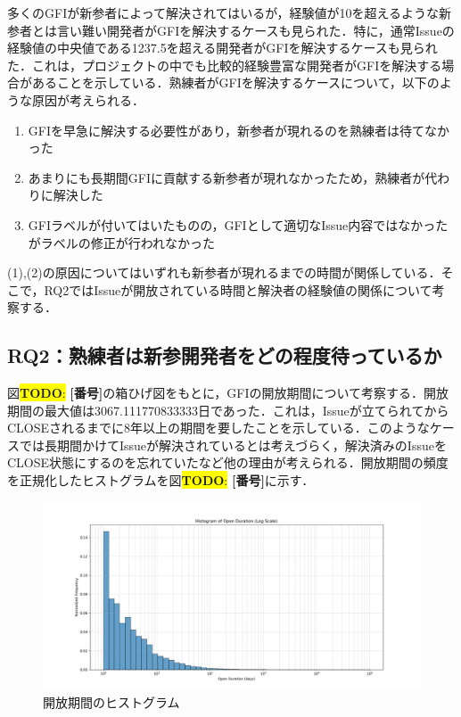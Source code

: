 \documentclass[11pt]{jreport}
\newcommand{\todo}[1]{\colorbox{yellow}{{\bf TODO}:}{\color{red} {\textbf{[#1]}}}}
\begin{document}
多くのGFIが新参者によって解決されてはいるが，経験値が10を超えるような新参者とは言い難い開発者がGFIを解決するケースも見られた．特に，通常Issueの経験値の中央値である1237.5を超える開発者がGFIを解決するケースも見られた．これは，プロジェクトの中でも比較的経験豊富な開発者がGFIを解決する場合があることを示している．熟練者がGFIを解決するケースについて，以下のような原因が考えられる．

\def\labelenumi{(\theenumi)}

\begin{enumerate}
  \item GFIを早急に解決する必要性があり，新参者が現れるのを熟練者は待てなかった
  \item あまりにも長期間GFIに貢献する新参者が現れなかったため，熟練者が代わりに解決した
  \item GFIラベルが付いてはいたものの，GFIとして適切なIssue内容ではなかったがラベルの修正が行われなかった
\end{enumerate}

(1),(2)の原因についてはいずれも新参者が現れるまでの時間が関係している．そこで，RQ2ではIssueが開放されている時間と解決者の経験値の関係について考察する．

\subsection{RQ2：熟練者は新参開発者をどの程度待っているか}

図\todo{番号}の箱ひげ図をもとに，GFIの開放期間について考察する．開放期間の最大値は3067.111770833333日であった．これは，Issueが立てられてからCLOSEされるまでに8年以上の期間を要したことを示している．このようなケースでは長期間かけてIssueが解決されているとは考えづらく，解決済みのIssueをCLOSE状態にするのを忘れていたなど他の理由が考えられる．開放期間の頻度を正規化したヒストグラムを図\todo{番号}に示す．

\begin{figure}[t]
\centerline{\includegraphics[width=0.9\linewidth]{@BSthesis2024_Nakai/BSthesis2024_Nakai_fig/time_hist.png}}
\caption{開放期間のヒストグラム}
\label{fig:milestone}
\end{figure}
\end{document}
